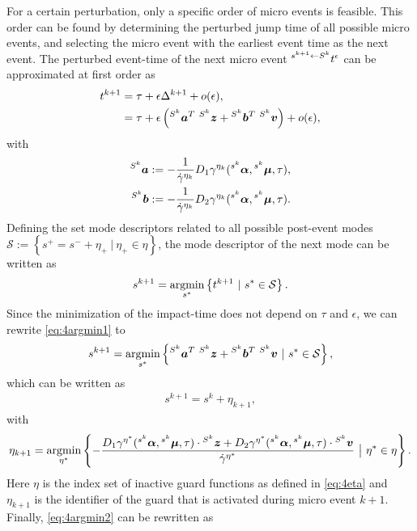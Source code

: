 \documentclass[../DC2017114Bouma.tex]{subfiles}
\begin{document}
For a certain perturbation, only a specific order of micro events is feasible. This order can be found by determining the perturbed jump time of all possible micro events, and selecting the micro event with the earliest event time as the next event. The perturbed event-time of the next micro event $\hspace{0cm}^{s^{k+1} \leftarrow S^{k}}t^\epsilon$ can be approximated at first order as
\begin{align}
t^{k+1} &= \tau + \epsilon\Delta^{k+1} + o(\epsilon),\\
&= \tau + \epsilon\left(\hspace{0cm}^{S^k}{\boldsymbol{a}}^T\ \hspace{0cm}^{S^k}{\boldsymbol{z}} +\hspace{0cm}^{S^k}{\boldsymbol{b}}^T\ \hspace{0cm}^{S^k}{\boldsymbol{v}}\right) + o(\epsilon),
\end{align}
with
\begin{align*}
\hspace{0cm}^{S^k}{\boldsymbol{a}} &:= -\frac{1}{\dot{\gamma}^{\eta_k}}D_1\gamma^{\eta_k}(\hspace{0cm}^{s^k}\boldsymbol{\alpha},\hspace{0cm}^{s^k}\boldsymbol{\mu},\tau),\\
\hspace{0cm}^{S^k}{\boldsymbol{b}} &:= -\frac{1}{\dot{\gamma}^{\eta_k}}D_2\gamma^{\eta_k}(\hspace{0cm}^{s^k}\boldsymbol{\alpha},\hspace{0cm}^{s^k}\boldsymbol{\mu},\tau).
\end{align*}
Defining the set mode descriptors related to all possible post-event modes $\mathcal{S} := \left\{ s^+ = s^- + \eta_+ \ |\ \eta_+\in \eta \right\}$, the mode descriptor of the next mode can be written as
%
\begin{align}
s^{k+1} = \underset{s^{\ast}}{\argmin}\left\{t^{k+1}\ |\ s^{\ast}\in\mathcal{S}\right\}.\label{eq:4argmin1}
\end{align}
Since the minimization of the impact-time does not depend on $\tau$ and $\epsilon$, we can rewrite \eqref{eq:4argmin1} to
\begin{align}
s^{k+1} = \underset{s^{\ast}}{\argmin}\left\{\ls^{S^k}\ab^T\ \ls^{S^k}\zb +\ls^{S^k}\bb^T\ \ls^{S^k}\vb\ |\ s^{\ast}\in\mathcal{S}\right\},
\end{align}
which can be written as
\begin{align}
s^{k+1} = s^k + \eta_{k+1},
\end{align}
with 
\begin{align}
\eta_{k+1} = \underset{\eta^\ast}{\argmin}\left\{-\frac{D_1\gamma^{\eta^\ast}(\ls^{s^k}\alphab,\ls^{s^k}\mub,\tau)\cdot\ls^{S^k}\zb + D_2\gamma^{\eta^\ast}(\ls^{s^k}\alphab,\ls^{s^k}\mub,\tau)\cdot\ls^{S^k}\vb}{\dot{\gamma}^{\eta^\ast}}\ \big|\ \eta^{\ast}\in\eta\right\}.\label{eq:4argmin2}
\end{align}
Here $\eta$ is the index set of inactive guard functions as defined in \eqref{eq:4eta} and $\eta_{k+1}$ is the identifier of the guard that is activated during micro event $k+1$. Finally, \eqref{eq:4argmin2} can be rewritten as
\end{document}

